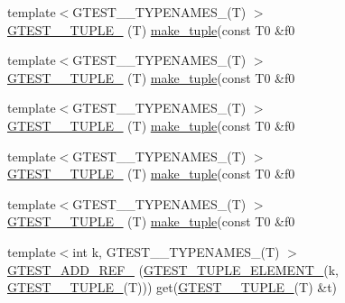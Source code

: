 \begin{DoxyCompactItemize}
{\footnotesize template$<$G\+T\+E\+S\+T\+\_\+\_\+\+T\+Y\+P\+E\+N\+A\+M\+E\+S\+\_\+(\+T) $>$ }\\\mbox{\hyperlink{namespacestd_1_1tr1_a31cde155977a4544af2b44b51ffe69ac}{G\+T\+E\+S\+T\+\_\+\_\+\+T\+U\+P\+L\+E\+\_\+}} (T) \mbox{\hyperlink{namespacestd_1_1tr1_af7e12a0f5b5791b5b7c49a5a17b85359}{make\+\_\+tuple}}(const T0 \&f0
\item 
{\footnotesize template$<$G\+T\+E\+S\+T\+\_\+\_\+\+T\+Y\+P\+E\+N\+A\+M\+E\+S\+\_\+(\+T) $>$ }\\\mbox{\hyperlink{namespacestd_1_1tr1_a61277f5af24b20fce87a9fd94307ab34}{G\+T\+E\+S\+T\+\_\+\_\+\+T\+U\+P\+L\+E\+\_\+}} (T) \mbox{\hyperlink{namespacestd_1_1tr1_af7e12a0f5b5791b5b7c49a5a17b85359}{make\+\_\+tuple}}(const T0 \&f0
\item 
{\footnotesize template$<$G\+T\+E\+S\+T\+\_\+\_\+\+T\+Y\+P\+E\+N\+A\+M\+E\+S\+\_\+(\+T) $>$ }\\\mbox{\hyperlink{namespacestd_1_1tr1_a29c8efcb79a4749e079b704c418266e6}{G\+T\+E\+S\+T\+\_\+\_\+\+T\+U\+P\+L\+E\+\_\+}} (T) \mbox{\hyperlink{namespacestd_1_1tr1_af7e12a0f5b5791b5b7c49a5a17b85359}{make\+\_\+tuple}}(const T0 \&f0
\item 
{\footnotesize template$<$G\+T\+E\+S\+T\+\_\+\_\+\+T\+Y\+P\+E\+N\+A\+M\+E\+S\+\_\+(\+T) $>$ }\\\mbox{\hyperlink{namespacestd_1_1tr1_a6afad1f98814ccc897d0b02bc6fc4e7d}{G\+T\+E\+S\+T\+\_\+\_\+\+T\+U\+P\+L\+E\+\_\+}} (T) \mbox{\hyperlink{namespacestd_1_1tr1_af7e12a0f5b5791b5b7c49a5a17b85359}{make\+\_\+tuple}}(const T0 \&f0
\item 
{\footnotesize template$<$G\+T\+E\+S\+T\+\_\+\_\+\+T\+Y\+P\+E\+N\+A\+M\+E\+S\+\_\+(\+T) $>$ }\\\mbox{\hyperlink{namespacestd_1_1tr1_aa636d3269bf1f368a7bc09ff158bc482}{G\+T\+E\+S\+T\+\_\+\_\+\+T\+U\+P\+L\+E\+\_\+}} (T) \mbox{\hyperlink{namespacestd_1_1tr1_af7e12a0f5b5791b5b7c49a5a17b85359}{make\+\_\+tuple}}(const T0 \&f0
\item 
{\footnotesize template$<$int k, G\+T\+E\+S\+T\+\_\+\_\+\+T\+Y\+P\+E\+N\+A\+M\+E\+S\+\_\+(\+T) $>$ }\\\mbox{\hyperlink{namespacestd_1_1tr1_a495d7fb7a131317a9ba985598d3c1504}{G\+T\+E\+S\+T\+\_\+\+A\+D\+D\+\_\+\+R\+E\+F\+\_\+}} (\mbox{\hyperlink{gtest-tuple_8h_a1b7f133d8aa02e0b7afed7b66781eeb7}{G\+T\+E\+S\+T\+\_\+\+T\+U\+P\+L\+E\+\_\+\+E\+L\+E\+M\+E\+N\+T\+\_\+}}(k, \mbox{\hyperlink{namespacestd_1_1tr1_aa636d3269bf1f368a7bc09ff158bc482}{G\+T\+E\+S\+T\+\_\+\_\+\+T\+U\+P\+L\+E\+\_\+}}(T))) get(\mbox{\hyperlink{namespacestd_1_1tr1_aa636d3269bf1f368a7bc09ff158bc482}{G\+T\+E\+S\+T\+\_\+\_\+\+T\+U\+P\+L\+E\+\_\+}}(T) \&t)

\end{DoxyCompactItemize}
